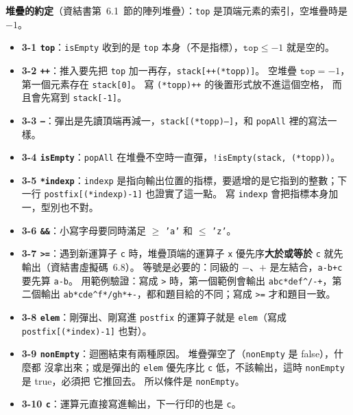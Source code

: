 \begin{pastsoln}
\textbf{堆疊的約定}（資結書第~6.1~節的陣列堆疊）：\texttt{top} 是頂端元素的索引，空堆疊時是 $-1$。
\begin{itemize}
\item \textbf{3-1 \texttt{top}}：\texttt{isEmpty} 收到的是 \texttt{top} 本身（不是指標），$\texttt{top} \le -1$ 就是空的。
\item \textbf{3-2 \texttt{++}}：推入要先把 \texttt{top} 加一再存，\texttt{stack[++(*topp)]}。 空堆疊
$\texttt{top} = -1$，第一個元素存在 \texttt{stack[0]}。 寫 \texttt{(*topp)++} 的後置形式放不進這個空格，
而且會先寫到 \texttt{stack[-1]}。
\item \textbf{3-3 \texttt{--}}：彈出是先讀頂端再減一，\texttt{stack[(*topp)--]}，和 \texttt{popAll} 裡的寫法一樣。
\item \textbf{3-4 \texttt{isEmpty}}：\texttt{popAll} 在堆疊不空時一直彈，\texttt{!isEmpty(stack, (*topp))}。
\item \textbf{3-5 \texttt{*indexp}}：\texttt{indexp} 是指向輸出位置的指標，要遞增的是它指到的整數；下一行
\texttt{postfix[(*indexp)-1]} 也證實了這一點。 寫 \texttt{indexp} 會把指標本身加一，型別也不對。
\item \textbf{3-6 \texttt{\&\&}}：小寫字母要同時滿足 $\ge$ \texttt{'a'} 和 $\le$ \texttt{'z'}。
\item \textbf{3-7 \texttt{>=}}：遇到新運算子 \texttt{c} 時，堆疊頂端的運算子 \texttt{x} 優先序\textbf{大於或等於}
\texttt{c} 就先輸出（資結書虛擬碼~6.8）。 等號是必要的：同級的 $-$、$+$ 是左結合，\texttt{a-b+c} 要先算
\texttt{a-b}。 用範例驗證：寫成 \texttt{>} 時，第一個範例會輸出 \texttt{abc*def\^{}/-+}，第二個輸出
\texttt{ab*cde\^{}f*/gh*+-}，都和題目給的不同；寫成 \texttt{>=} 才和題目一致。
\item \textbf{3-8 \texttt{elem}}：剛彈出、剛寫進 \texttt{postfix} 的運算子就是 \texttt{elem}（寫成
\texttt{postfix[(*index)-1]} 也對）。
\item \textbf{3-9 \texttt{nonEmpty}}：迴圈結束有兩種原因。 堆疊彈空了（\texttt{nonEmpty} 是 false），什麼都
沒拿出來；或是彈出的 \texttt{elem} 優先序比 \texttt{c} 低，不該輸出，這時 \texttt{nonEmpty} 是 true，必須把
它推回去。 所以條件是 \texttt{nonEmpty}。
\item \textbf{3-10 \texttt{c}}：運算元直接寫進輸出，下一行印的也是 \texttt{c}。
\end{itemize}


\end{pastsoln}
